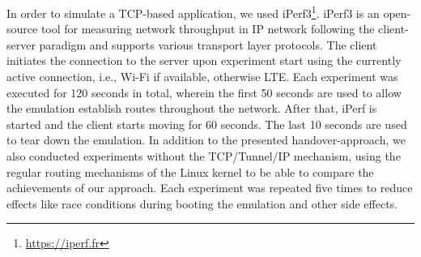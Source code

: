 
In order to simulate a TCP-based application, we used iPerf3\footnote{\url{https://iperf.fr}}.
iPerf3 is an open-source tool for measuring network throughput in IP network following the client-server paradigm and supports various transport layer protocols.
The client initiates the connection to the server upon experiment start using the currently active connection, i.e., Wi-Fi if available, otherwise LTE.
Each experiment was executed for 120 seconds in total, wherein the first 50 seconds are used to allow the emulation establish routes throughout the network.%
After that, iPerf is started and the client starts moving for 60 seconds.
The last 10 seconds are used to tear down the emulation.
In addition to the presented handover-approach, we also conducted experiments without the TCP/Tunnel/IP mechanism, using the regular routing mechanisms of the Linux kernel to be able to compare the achievements of our approach.
Each experiment was repeated five times to reduce effects like race conditions during booting the emulation and other side effects.


